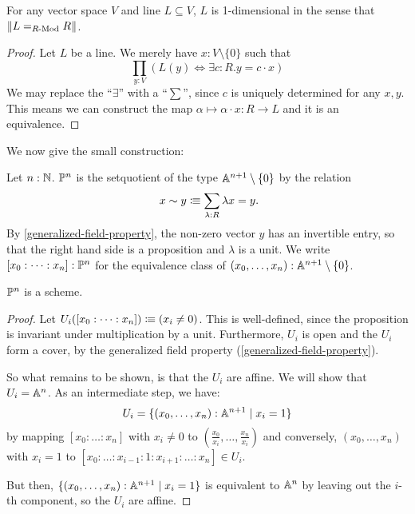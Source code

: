 \begin{proposition}%
  \label{lines-are-one-dimensional}
  For any vector space $V$ and line $L\subseteq V$,
  $L$ is 1-dimensional in the sense that $\lVert L=_{R\text{-}\mathrm{Mod}}R \rVert$.
\end{proposition}

\begin{proof}
  Let $L$ be a line.
  We merely have $x:V\setminus\{0\}$ such that 
  \[ \prod_{y:V}\left(L (y) \Leftrightarrow \exists c:R.y=c\cdot x\right)\]
  We may replace the ``$\exists$'' with a ``$\sum$'',
  since $c$ is uniquely determined for any $x,y$.
  This means we can construct the map $\alpha\mapsto \alpha\cdot x:R\to L$ and it is an equivalence.
\end{proof}

We now give the small construction:

\begin{definition}%
  \label{projective-space-hit}
  Let $n:\mathbb{N}$.
   $\mathbb{P}^n$ is the setquotient of the type $\mathbb{A}^{n+1}\setminus\{0\}$ by the relation
  \[
    x \sim y \colonequiv \sum_{\lambda : R} \lambda x=y\rlap{.}
  \]
  By \cref{generalized-field-property}, the non-zero vector $y$ has an invertible entry,
  so that the right hand side is a proposition and $\lambda$ is a unit.
  We write $[x_0:\dots:x_n]:\mathbb{P}^n$ for the equivalence class of $(x_0,\dots,x_n):\mathbb{A}^{n+1}\setminus\{0\}$.
\end{definition}

\begin{theorem}
  $\mathbb{P}^n$ is a scheme.
\end{theorem}

\begin{proof}
  Let $U_i([x_0:\dots:x_n])\vcentcolon\mspace{-1.2mu}\equiv (x_i\neq 0)$.
  This is well-defined, since the proposition is invariant under multiplication by a unit.
  Furthermore, $U_i$ is open and the $U_i$ form a cover,
  by the generalized field property
  (\cref{generalized-field-property}).

  So what remains to be shown, is that the $U_i$ are affine.
  We will show that $U_i=\mathbb{A}^n$.
  As an intermediate step, we have:
  \[
    U_i=\{(x_0,\dots,x_n):\mathbb{A}^{n+1}\mid x_i=1\}
  \]
  by mapping $[x_0:\dots:x_n]$ with $x_i\neq 0$
  to $\left(\frac{x_0}{x_i},\dots,\frac{x_n}{x_i}\right)$
  and conversely, $(x_0,\dots,x_n)$ with $x_i=1$ to $[x_0:\dots:x_{i-1}:1:x_{i+1}:\dots:x_n]\in U_i$.

  But then, $\{(x_0,\dots,x_n):\mathbb{A}^{n+1}\mid x_i=1\}$
  is equivalent to $\mathbb{A}^n$ by leaving out the $i$-th component,
  so the $U_i$ are affine.
\end{proof}

